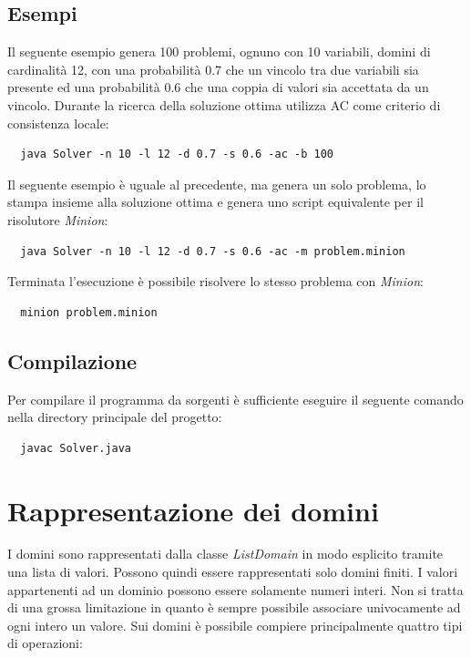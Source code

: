 \documentclass[a4paper,12pt,italian]{article}
\begin{document}
\subsection{Esempi}

Il seguente esempio genera 100 problemi, ognuno con 10 variabili,
domini di cardinalit\`a 12, con una probabilit\`a 0.7 che un vincolo
tra due variabili sia presente ed una probabilit\`a 0.6 che una coppia
di valori sia accettata da un vincolo. Durante la ricerca della
soluzione ottima utilizza AC come criterio di consistenza locale:

\begin{verbatim}
  java Solver -n 10 -l 12 -d 0.7 -s 0.6 -ac -b 100
\end{verbatim}

Il seguente esempio \`e uguale al precedente, ma genera un solo
problema, lo stampa insieme alla soluzione ottima e genera uno script
equivalente per il risolutore \textit{Minion}:

\begin{verbatim}
  java Solver -n 10 -l 12 -d 0.7 -s 0.6 -ac -m problem.minion
\end{verbatim}

Terminata l'esecuzione \`e possibile risolvere lo stesso problema con
\textit{Minion}:

\begin{verbatim}
  minion problem.minion
\end{verbatim}

\subsection{Compilazione}

Per compilare il programma da sorgenti \`e sufficiente eseguire il
seguente comando nella directory principale del progetto:

\begin{verbatim}
  javac Solver.java
\end{verbatim}

\section{Rappresentazione dei domini}

I domini sono rappresentati dalla classe \textit{ListDomain} in modo
esplicito tramite una lista di valori. Possono quindi essere
rappresentati solo domini finiti. I valori appartenenti ad un dominio
possono essere solamente numeri interi. Non si tratta di una grossa
limitazione in quanto \`e sempre possibile associare univocamente ad
ogni intero un valore. Sui domini \`e possibile compiere
principalmente quattro tipi di operazioni:
\end{document}
